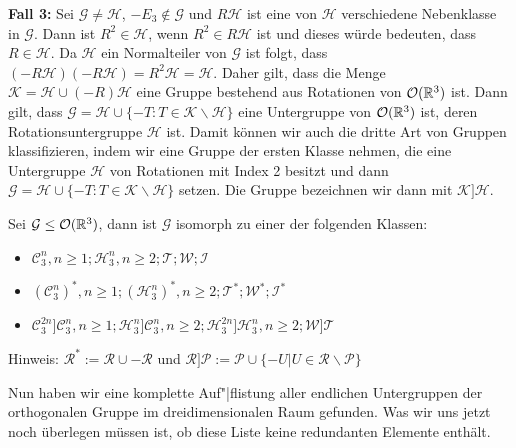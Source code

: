  \textbf{Fall 3:} Sei $\mathcal{G}\neq \mathcal{H}$, $-E_3 \notin \mathcal{G}$ und $R\mathcal{H}$ ist eine von $\mathcal{H}$ verschiedene Nebenklasse in $\mathcal{G}$. Dann ist $R^2\in\mathcal{H}$, wenn $R^2 \in R \mathcal{H}$ ist und dieses würde bedeuten, dass $R \in \mathcal{H}$. Da $\mathcal{H}$ ein Normalteiler von $\mathcal{G}$ ist folgt, dass $(-R\mathcal{H})(-R\mathcal{H})=R^2\mathcal{H}=\mathcal{H}$. Daher gilt, dass die Menge $\mathcal{K} = \mathcal{H} \cup (-R)\mathcal{H}$ eine Gruppe bestehend aus Rotationen von ${\mathcal{O}(\mathbb{R}^3)}$ ist. Dann gilt, dass $\mathcal{G} = \mathcal{H} \cup \{-T:T\in\mathcal{K}\backslash\mathcal{H}\}$ eine Untergruppe von ${\mathcal{O}(\mathbb{R}^3)}$ ist, deren Rotationsuntergruppe $\mathcal{H}$ ist. Damit können wir auch die dritte Art von Gruppen klassifizieren, indem wir eine Gruppe der ersten Klasse nehmen, die eine Untergruppe $\mathcal{H}$ von Rotationen mit Index 2 besitzt und dann $\mathcal{G}=\mathcal{H}\cup\{-T:T\in\mathcal{K}\backslash\mathcal{H}\}$ setzen. Die Gruppe bezeichnen wir dann mit $\mathcal{K}]\mathcal{H}$.


\begin{theorem}
 Sei $\mathcal{G}\leq{\mathcal{O}(\mathbb{R}^3)}$, dann ist $\mathcal{G}$ isomorph zu einer der folgenden Klassen:
 \begin{itemize}
  \item $\mathcal{C}^n_3,n\geq1;\mathcal{H}^n_3,n\geq2;\mathcal{T};\mathcal{W};\mathcal{I}$
  \item $(\mathcal{C}^n_3)^*,n\geq1;(\mathcal{H}^n_3)^*,n\geq 2;\mathcal{T}^*;\mathcal{W}^*;\mathcal{I}^*$
  \item $\mathcal{C}^{2n}_3]\mathcal{C}^n_3,n\geq1;\mathcal{H}^n_3]\mathcal{C}^n_3,n\geq 2;\mathcal{H}^{2n}_3]\mathcal{H}^n_3,n\geq2;\mathcal{W}]\mathcal{T}$
\end{itemize}
Hinweis: $\mathcal{R}^*:=\mathcal{R}\cup -\mathcal{R}$ und $\mathcal{R}]\mathcal{P}:=\mathcal{P}\cup \{-U|U\in \mathcal{R} \backslash \mathcal{P} \}$
\end{theorem}
Nun haben wir eine komplette Auf"|flistung aller endlichen Untergruppen der orthogonalen Gruppe im dreidimensionalen Raum gefunden. Was wir uns jetzt noch überlegen müssen ist, ob diese Liste keine redundanten Elemente enthält.


